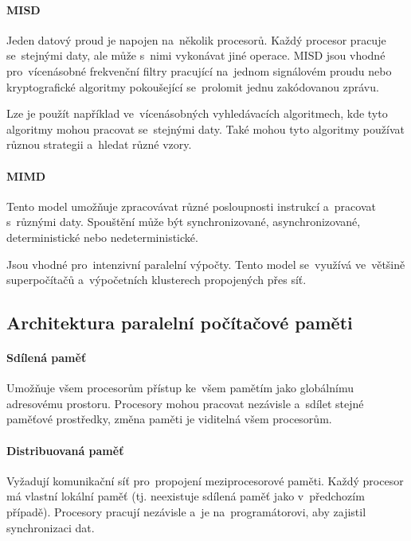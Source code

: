 \paragraph{MISD}

Jeden datový proud je napojen na~několik procesorů. Každý procesor pracuje se~stejnými daty, ale může s~nimi vykonávat jiné operace. MISD jsou vhodné pro~vícenásobné frekvenční filtry pracující na~jednom signálovém proudu nebo kryptografické algoritmy pokoušející se~prolomit jednu zakódovanou zprávu.

Lze je použít například ve~vícenásobných vyhledávacích algoritmech, kde tyto algoritmy mohou pracovat se~stejnými daty. Také mohou tyto algoritmy používat různou strategii a~hledat různé vzory.

\paragraph{MIMD}

Tento model umožňuje zpracovávat různé posloupnosti instrukcí a~pracovat s~různými daty. Spouštění může být synchronizované, asynchronizované, deterministické nebo nedeterministické.

Jsou vhodné pro~intenzivní paralelní výpočty. Tento model se~využívá ve~většině superpočítačů a~výpočetních klusterech propojených přes síť.

\subsection{Architektura paralelní počítačové paměti}

\paragraph{Sdílená paměť}

Umožňuje všem procesorům přístup ke~všem pamětím jako globálnímu adresovému prostoru. Procesory mohou pracovat nezávisle a~sdílet stejné paměťové prostředky, změna paměti je viditelná všem procesorům.

\paragraph{Distribuovaná paměť}

Vyžadují komunikační síť pro~propojení meziprocesorové paměti. Každý procesor má vlastní lokální paměť (tj. neexistuje sdílená paměť jako v~předchozím případě). Procesory pracují nezávisle a~je na~programátorovi, aby zajistil synchronizaci dat.

